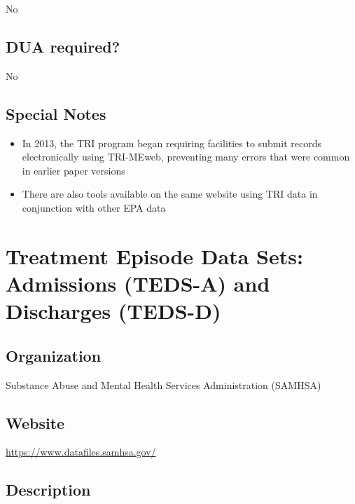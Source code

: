 \documentclass[
]{book}
\providecommand{\tightlist}{%
  \setlength{\itemsep}{0pt}\setlength{\parskip}{0pt}}
\begin{document}
No

\hypertarget{dua-required-89}{%
\section{DUA required?}\label{dua-required-89}}

No

\hypertarget{special-notes-89}{%
\section{Special Notes}\label{special-notes-89}}

\begin{itemize}
\tightlist
\item
  In 2013, the TRI program began requiring facilities to submit records electronically using TRI-MEweb, preventing many errors that were common in earlier paper versions
\item
  There are also tools available on the same website using TRI data in conjunction with other EPA data
\end{itemize}

\mainmatter

\hypertarget{treatment-episode-data-sets-admissions-teds-a-and-discharges-teds-d}{%
\chapter{Treatment Episode Data Sets: Admissions (TEDS-A) and Discharges (TEDS-D)}\label{treatment-episode-data-sets-admissions-teds-a-and-discharges-teds-d}}

\hypertarget{organization-90}{%
\section{Organization}\label{organization-90}}

Substance Abuse and Mental Health Services Administration (SAMHSA)

\hypertarget{website-90}{%
\section{Website}\label{website-90}}

\url{https://www.datafiles.samhsa.gov/}

\hypertarget{description-90}{%
\section{Description}\label{description-90}}
\end{document}
